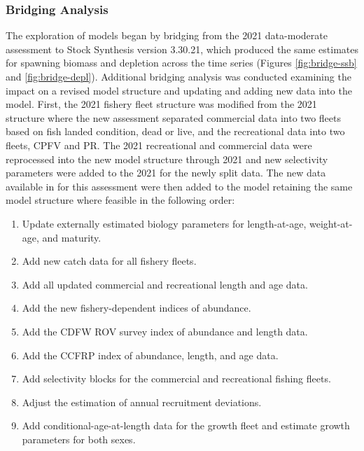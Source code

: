 \documentclass[11pt,
  english,
  letterpaper,
]{article}
\providecommand{\tightlist}{%
  \setlength{\itemsep}{0pt}\setlength{\parskip}{0pt}}
\providecommand{\tightlist}{%
  \setlength{\itemsep}{0pt}\setlength{\parskip}{0pt}}
\begin{document}
\hypertarget{bridging-analysis}{%
\subsubsection{Bridging Analysis}\label{bridging-analysis}}

The exploration of models began by bridging from the 2021 data-moderate assessment to Stock Synthesis version 3.30.21, which produced the same estimates for spawning biomass and depletion across the time series (Figures \ref{fig:bridge-ssb} and \ref{fig:bridge-depl}). Additional bridging analysis was conducted examining the impact on a revised model structure and updating and adding new data into the model. First, the 2021 fishery fleet structure was modified from the 2021 structure where the new assessment separated commercial data into two fleets based on fish landed condition, dead or live, and the recreational data into two fleets, CPFV and PR. The 2021 recreational and commercial data were reprocessed into the new model structure through 2021 and new selectivity parameters were added to the 2021 for the newly split data. The new data available in for this assessment were then added to the model retaining the same model structure where feasible in the following order:

\begin{enumerate}
\def\labelenumi{\arabic{enumi}.}
\tightlist
\item
  Update externally estimated biology parameters for length-at-age, weight-at-age, and maturity.
\item
  Add new catch data for all fishery fleets.
\item
  Add all updated commercial and recreational length and age data.
\item
  Add the new fishery-dependent indices of abundance.
\item
  Add the CDFW ROV survey index of abundance and length data.
\item
  Add the CCFRP index of abundance, length, and age data.
\item
  Add selectivity blocks for the commercial and recreational fishing fleets.
\item
  Adjust the estimation of annual recruitment deviations.
\item
  Add conditional-age-at-length data for the growth fleet and estimate growth parameters for both sexes.
\end{enumerate}
\end{document}
